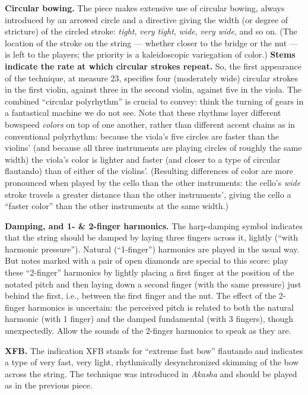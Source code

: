 \textbf{Circular bowing.} The piece makes extensive use of circular bowing, always
introduced by an arrowed circle and a directive giving the width (or degree of stricture)
of the circled stroke: \textit{tight}, \textit{very tight}, \textit{wide}, \textit{very
wide}, and so on. (The location of the stroke on the string --- whether closer to the
bridge or the nut --- is left to the players; the priority is a kaleidoscopic variegation
of color.) \textbf{Stems indicate the rate at which circular strokes repeat.} So, the
first appearance of the technique, at measure 23, specifies four (moderately wide)
circular strokes in the first violin, against three in the second violin, against five in
the viola. The combined ``circular polyrhythm'' is crucial to convey: think the turning
of gears in a fantastical machine we do not see. Note that these rhythms layer different
bowspeed \textit{colors} on top of one another, rather than different accent chains as in
conventional polyrhythm: because the viola's five circles are faster than the violins'
(and because all three instruments are playing circles of roughly the same width) the
viola's color is lighter and faster (and closer to a type of circular flautando) than of
either of the violins'. (Resulting differences of color are more pronounced when played
by the cello than the other instruments: the cello's \textit{wide} stroke travels a
greater distance than the other instruments', giving the cello a ``faster color'' than
the other instruments at the same width.)

\textbf{Damping, and 1- \& 2-finger harmonics.} The harp-damping symbol indicates that
the string should be damped by laying three fingers across it, lightly (``with harmonic
pressure''). Natural (``1-finger'') harmonics are played in the usual way. But notes
marked with a pair of open diamonds are special to this score: play these ``2-finger''
harmonics by lightly placing a first finger at the position of the notated pitch and then
laying down a second finger (with the same pressure) just behind the first, i.e., between
the first finger and the nut. The effect of the 2-finger harmonics is uncertain: the
perceived pitch is related to both the natural harmonic (with 1 finger) and the damped
fundamental (with 3 fingers), though unexpectedly. Allow the sounds of the 2-finger
harmonics to speak as they are.

\textbf{XFB.} The indication XFB stands for ``extreme fast bow'' flautando and indicates
a type of very fast, very light, rhythmically desynchronized skimming of the bow across
the string. The technique was introduced in \textit{Akasha} and should be played as in
the previous piece.

